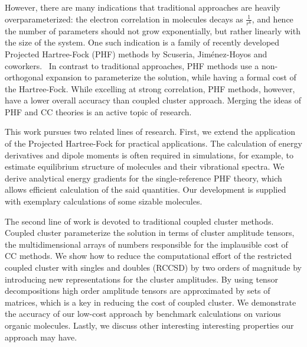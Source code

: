 However, there are many indications that traditional approaches are heavily 
overparameterized: the electron correlation in molecules decays as 
$\frac{1}{r^6}$, and hence the number of parameters should not grow 
exponentially, but rather linearly with the size of the system. One such 
indication is a family of recently developed Projected Hartree-Fock (PHF)
methods by Scuseria, Jim{\'e}nez-Hoyos and coworkers.~\cite{} In contrast to 
traditional approaches, PHF methods use a non-orthogonal expansion to 
parameterize the solution, while having a formal cost of the Hartree-Fock. While 
excelling at strong correlation, PHF methods, however, have a lower overall 
accuracy than coupled cluster approach. Merging the ideas of PHF and CC theories 
is an active topic of research.~\cite{}

This work pursues two related lines of research. First, we extend the 
application of the Projected Hartree-Fock for practical applications. The 
calculation of energy derivatives and dipole moments is often required in 
simulations, for example, to estimate equilibrium structure of molecules and 
their vibrational spectra. We derive analytical energy gradients for the 
single-reference PHF theory, which allows efficient calculation of the said 
quantities. Our development is supplied with exemplary calculations of 
some sizable molecules.

The second line of work is devoted to traditional coupled cluster 
methods. Coupled cluster parameterize the solution in terms of cluster 
amplitude tensors, the multidimensional arrays of numbers responsible for the 
implausible cost of CC methods. We show how to reduce the computational effort 
of the restricted coupled cluster with singles and doubles (RCCSD) by two 
orders of magnitude by introducing new representations for the cluster 
amplitudes. By using tensor decompositions high order amplitude tensors are 
approximated by sets of matrices, which is a key in reducing the cost of 
coupled cluster. We demonstrate the accuracy of our low-cost approach by 
benchmark calculations on various organic molecules. Lastly, we discuss other 
interesting interesting properties our approach may have.

